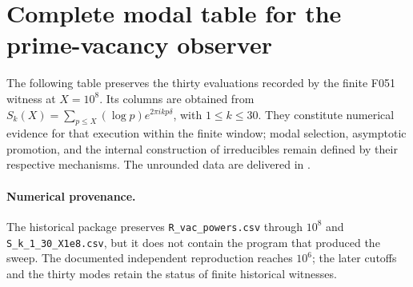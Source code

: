 \section{Complete modal table for the prime-vacancy observer}
\label{v:f051:appendix:modal-table}

The following table preserves the thirty evaluations recorded by the finite
F051 witness at \(X=10^8\). Its columns are obtained from
\(S_k(X)=\sum_{p\leq X}(\log p)e^{2\pi i k p\delta}\), with
\(1\leq k\leq30\). They constitute numerical evidence for that execution
within the finite window; modal selection, asymptotic promotion, and the
internal construction of irreducibles remain defined by their respective
mechanisms. The unrounded data are delivered in
.

\paragraph{Numerical provenance.}
The historical package preserves \texttt{R\_vac\_powers.csv} through
\(10^8\) and \texttt{S\_k\_1\_30\_X1e8.csv}, but it does not contain the
program that produced the sweep. The documented independent reproduction
reaches \(10^6\); the later cutoffs and the thirty modes retain the status
of finite historical witnesses.


